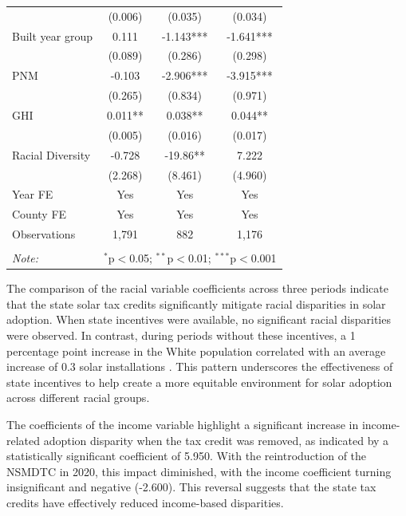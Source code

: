 \documentclass[11pt,twoside,letterpaper]{article}
\begin{document}
\begin{table}[!ht]
{\begin{tabular}{lccc}
 & (0.006) & (0.035) & (0.034) \\
Built year group & 0.111 & -1.143*** & -1.641*** \\
 & (0.089) & (0.286) & (0.298) \\
PNM & -0.103 & -2.906*** & -3.915*** \\
 & (0.265) & (0.834) & (0.971) \\
GHI & 0.011** & 0.038** & 0.044** \\
 & (0.005) & (0.016) & (0.017) \\
Racial Diversity & -0.728 & -19.86** & 7.222 \\
 & (2.268) & (8.461) & (4.960) \\ \cline{1-4}
Year FE & Yes & Yes & Yes \\
County FE & Yes & Yes & Yes \\
Observations & 1,791 & 882 & 1,176 \\
\hline
\hline \\[-1.8ex]
\textit{Note:} & \multicolumn{3}{r}{$^{*}$p$<$0.05; $^{**}$p$<$0.01; $^{***}$p$<$0.001} \\
\end{tabular}}
\end{table}

The comparison of the racial variable coefficients across three periods indicate that the state solar tax credits significantly mitigate racial disparities in solar adoption. When state incentives were available, no significant racial disparities were observed. In contrast, during periods without these incentives, a 1 percentage point increase in the White population correlated with an average increase of 0.3 solar installations%
. This pattern underscores the effectiveness of state incentives to help create a more equitable environment for solar adoption across different racial groups. 

The coefficients of the income variable highlight a significant increase in income-related adoption disparity when the tax credit was removed, as indicated by a statistically significant coefficient of 5.950. With the reintroduction of the NSMDTC in 2020, this impact diminished, with the income coefficient turning insignificant and negative (-2.600). This reversal suggests that the state tax credits have effectively reduced income-based disparities. 
\end{document}
